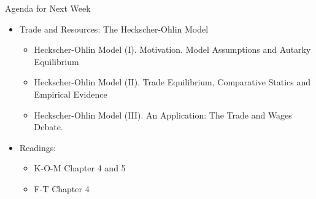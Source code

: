 \documentclass[10pt,hyperref={CJKbookmarks=true},xcolor=dvipsnames,aspectratio=169]{beamer}
\begin{document}
\begin{frame}{Agenda for Next Week}

\begin{itemize}
 \item Trade and Resources: The Heckscher-Ohlin Model
	
	\begin{itemize}
		\item Heckscher-Ohlin Model (I). Motivation. Model Assumptions and Autarky
		Equilibrium
		\item Heckscher-Ohlin Model (II). Trade Equilibrium, Comparative Statics
		and Empirical Evidence
		\item Heckscher-Ohlin Model (III). An Application: The Trade and Wages Debate. 
	\end{itemize}
 \item Readings: 
	
	\begin{itemize}
		\item K-O-M Chapter 4 and 5 
		\item F-T Chapter 4
	\end{itemize}
\end{itemize}
\end{frame}
\end{document}
